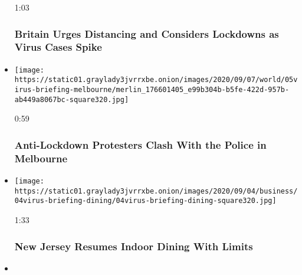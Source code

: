 \begin{itemize}
  1:03

  \hypertarget{britain-urges-distancing-and-considers-lockdowns-as-virus-cases-spike}{%
  \subsubsection{Britain Urges Distancing and Considers Lockdowns as
  Virus Cases
  Spike}\label{britain-urges-distancing-and-considers-lockdowns-as-virus-cases-spike}}
\item
  \href{https://www.nytimes3xbfgragh.onion/video/world/australia/100000007326477/melbourne-coronavirus-protest.html?action=click\&module=video-series-bar\&region=header\&pgtype=Article\&playlistId=video/coronavirus-news-update}{}

  \texttt{[image: https://static01.graylady3jvrrxbe.onion/images/2020/09/07/world/05virus-briefing-melbourne/merlin\_176601405\_e99b304b-b5fe-422d-957b-ab449a8067bc-square320.jpg]}

  0:59

  \hypertarget{anti-lockdown-protesters-clash-with-the-police-in-melbourne}{%
  \subsubsection{Anti-Lockdown Protesters Clash With the Police in
  Melbourne}\label{anti-lockdown-protesters-clash-with-the-police-in-melbourne}}
\item
  \href{https://www.nytimes3xbfgragh.onion/video/us/politics/100000007325803/new-jersey-governor-indoor-dining-smoking.html?action=click\&module=video-series-bar\&region=header\&pgtype=Article\&playlistId=video/coronavirus-news-update}{}

  \texttt{[image: https://static01.graylady3jvrrxbe.onion/images/2020/09/04/business/04virus-briefing-dining/04virus-briefing-dining-square320.jpg]}

  1:33

  \hypertarget{new-jersey-resumes-indoor-dining-with-limits}{%
  \subsubsection{New Jersey Resumes Indoor Dining With
  Limits}\label{new-jersey-resumes-indoor-dining-with-limits}}
\item
  \href{https://www.nytimes3xbfgragh.onion/video/us/politics/100000007323276/pfizer-coronavirus-vaccine-october.html?action=click\&module=video-series-bar\&region=header\&pgtype=Article\&playlistId=video/coronavirus-news-update}{}


\end{itemize}
